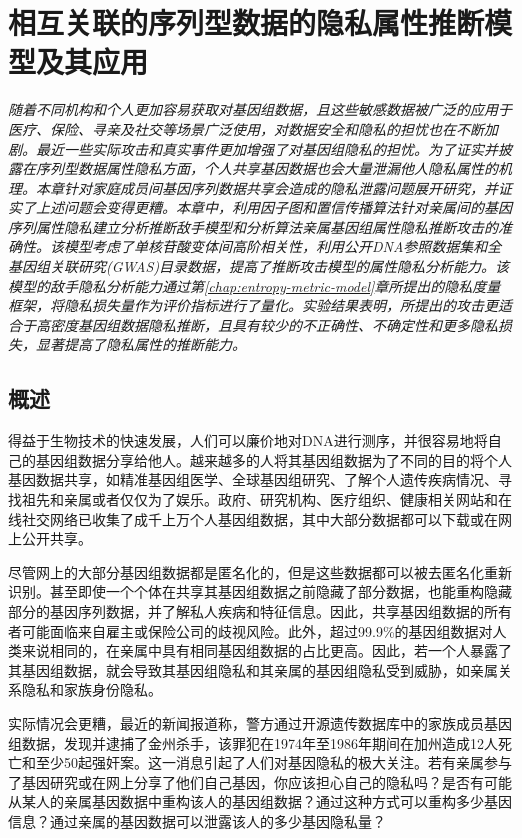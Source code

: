 \chapter{相互关联的序列型数据的隐私属性推断模型及其应用}
\label{chap:inference-attack-on-related-sequenced-data}
\textit{ }

\textit{随着不同机构和个人更加容易获取对基因组数据，且这些敏感数据被广泛的应用于医疗、保险、寻亲及社交等场景广泛使用，对数据安全和隐私的担忧也在不断加剧。最近一些实际攻击和真实事件更加增强了对基因组隐私的担忧。为了证实并披露在序列型数据属性隐私方面，个人共享基因数据也会大量泄漏他人隐私属性的机理。本章针对家庭成员间基因序列数据共享会造成的隐私泄露问题展开研究，并证实了上述问题会变得更糟。本章中，利用因子图和置信传播算法针对亲属间的基因序列属性隐私建立分析推断敌手模型和分析算法亲属基因组属性隐私推断攻击的准确性。该模型考虑了单核苷酸变体间高阶相关性，利用公开DNA参照数据集和全基因组关联研究(GWAS)目录数据，提高了推断攻击模型的属性隐私分析能力。该模型的敌手隐私分析能力通过第\ref{chap:entropy-metric-model}章所提出的隐私度量框架，将隐私损失量作为评价指标进行了量化。实验结果表明，所提出的攻击更适合于高密度基因组数据隐私推断，且具有较少的不正确性、不确定性和更多隐私损失，显著提高了隐私属性的推断能力。}

\section{概述}
得益于生物技术的快速发展，人们可以廉价地对DNA进行测序，并很容易地将自己的基因组数据分享给他人。越来越多的人将其基因组数据为了不同的目的将个人基因数据共享，如精准基因组医学、全球基因组研究、了解个人遗传疾病情况、寻找祖先和亲属或者仅仅为了娱乐。政府、研究机构、医疗组织、健康相关网站和在线社交网络已收集了成千上万个人基因组数据，其中大部分数据都可以下载或在网上公开共享。

尽管网上的大部分基因组数据都是匿名化的，但是这些数据都可以被去匿名化重新识别\cite{greenbaum2008genomic,humbert2015de}。甚至即使一个个体在共享其基因组数据之前隐藏了部分数据，也能重构隐藏部分的基因序列数据，并了解私人疾病和特征信息。因此，共享基因组数据的所有者可能面临来自雇主或保险公司的歧视风险。此外，超过99.9\%的基因组数据对人类来说相同的，在亲属中具有相同基因组数据的占比更高。因此，若一个人暴露了其基因组数据，就会导致其基因组隐私和其亲属的基因组隐私受到威胁，如亲属关系隐私和家族身份隐私\cite{rohlfs2012familial}。


实际情况会更糟，最近的新闻报道称，警方通过开源遗传数据库中的家族成员基因组数据，发现并逮捕了金州杀手，该罪犯在1974年至1986年期间在加州造成12人死亡和至少50起强奸案。这一消息引起了人们对基因隐私的极大关注。若有亲属参与了基因研究或在网上分享了他们自己基因，你应该担心自己的隐私吗？是否有可能从某人的亲属基因数据中重构该人的基因组数据？通过这种方式可以重构多少基因信息？通过亲属的基因数据可以泄露该人的多少基因隐私量？

